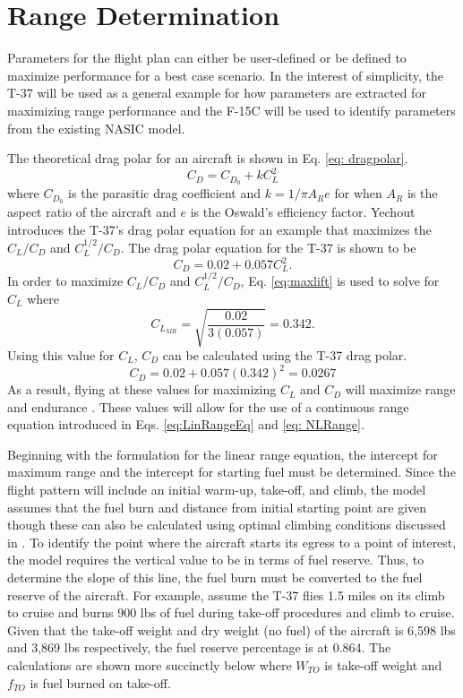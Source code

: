 \section{Range Determination}
Parameters for the flight plan can either be user-defined or be defined to maximize performance for a best case scenario. In the interest of simplicity, the T-37 will be used as a general example for how parameters are extracted for maximizing range performance and the F-15C will be used to identify parameters from the existing NASIC model. \par
The theoretical drag polar for an aircraft is shown in Eq. \ref{eq: dragpolar}.
\begin{equation}
    C_D = C_{D_0} + kC_L^2
    \label{eq: dragpolar}
\end{equation}
where $C_{D_0}$ is the parasitic drag coefficient and $k = 1/\pi A_Re$ for when $A_R$ is the aspect ratio of the aircraft and $e$ is the Oswald's efficiency factor. Yechout \cite{IntroACMechanics} introduces the T-37's drag polar equation for an example that maximizes the $C_L/C_D$ and $C_L^{1/2}/C_D$. The drag polar equation for the T-37 is shown to be  
\begin{equation*}
    C_D = 0.02 + 0.057C_L^2.
\end{equation*}
In order to maximize $C_L/C_D$ and $C_L^{1/2}/C_D$, Eq. \ref{eq:maxlift} is used to solve for $C_L$ where
\begin{equation*}
    C_{L_{MR}} = \sqrt{\dfrac{0.02}{3(0.057)}} = 0.342.
\end{equation*}
Using this value for $C_L$, $C_D$ can be calculated using the T-37 drag polar.
\begin{equation*}
    C_D = 0.02 + 0.057(0.342)^2 = 0.0267
\end{equation*}
As a result, flying at these values for maximizing $C_L$ and $C_D$ will maximize range and endurance \cite{IntrotoAero}. These values will allow for the use of a continuous range equation introduced in Eqs. \ref{eq:LinRangeEq} and \ref{eq: NLRange}. \par
Beginning with the formulation for the linear range equation, the intercept for maximum range and the intercept for starting fuel must be determined. Since the flight pattern will include an initial warm-up, take-off, and climb, the model assumes that the fuel burn and distance from initial starting point are given though these can also be calculated using optimal climbing conditions discussed in \cite{IntroACMechanics}. To identify the point where the aircraft starts its egress to a point of interest, the model requires the vertical value to be in terms of fuel reserve. Thus, to determine the slope of this line, the fuel burn must be converted to the fuel reserve of the aircraft. For example, assume the T-37 flies 1.5 miles on its climb to cruise and burns 900 lbs of fuel during take-off procedures and climb to cruise. Given that the take-off weight and dry weight (no fuel) of the aircraft is 6,598 lbs and 3,869 lbs respectively, the fuel reserve percentage is at 0.864. The calculations are shown more succinctly below where $W_{TO}$ is take-off weight and $f_{TO}$ is fuel burned on take-off.
